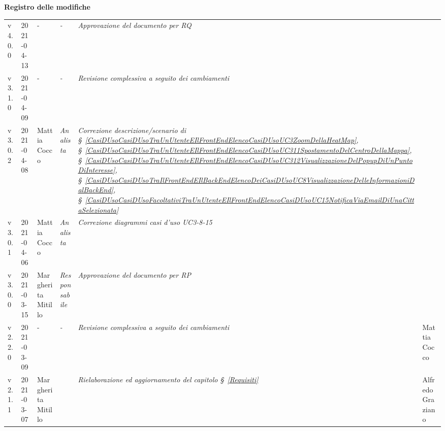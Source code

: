 \quad
\begin{center}
	\LARGE\textbf{Registro delle modifiche}
\end{center}
\def\tabularxcolumn#1{m{#1}}
{

\begin{center}
	\renewcommand{\arraystretch}{1.4}
	\begin{longtable}[c]{|p{2cm-1\tabcolsep}|p{2cm}|p{3cm-2\tabcolsep}|p{}|p{4cm-2\tabcolsep}|p{}|}
		\hline
		\rowcolor{airforceblue}
		\makecell[c]{\textbf{Versione}} & \makecell[c]{\textbf{Data}} & \makecell[c]{\textbf{Autore}} & \makecell[c]{\textbf{Ruolo}} & \makecell[c]{\textbf{Modifica}} & \makecell[c]{\textbf{Verificatore}} \\
		\hline
		\centering v4.0.0 & 2021-04-13 & \centering - & \centering \textit{-} & \textit{Approvazione del documento per RQ} & \makecell[c]{Andrea Cecchin}\\
		\hline
		\centering v3.1.0 & 2021-04-09 & \centering - & \centering \textit{-} & \textit{Revisione complessiva a seguito dei cambiamenti} & \makecell[c]{Andrea Cecchin}\\
		\hline
		\centering v3.0.2 & 2021-04-08 & Mattia Cocco & \centering \textit{Analista} & \textit{Correzione descrizione/scenario di \S~\ref{CasiDUsoCasiDUsoTraUnUtenteEIlFrontEndElencoCasiDUsoUC3ZoomDellaHeatMap}, \S~\ref{CasiDUsoCasiDUsoTraUnUtenteEIlFrontEndElencoCasiDUsoUC311SpostamentoDelCentroDellaMappa}, \S~\ref{CasiDUsoCasiDUsoTraUnUtenteEIlFrontEndElencoCasiDUsoUC312VisualizzazioneDelPopupDiUnPuntoDiInteresse}, \S~\ref{CasiDUsoCasiDUsoTraIlFrontEndEIlBackEndElencoDeiCasiDUsoUC8VisualizzazioneDelleInformazioniDalBackEnd}, \S~\ref{CasiDUsoCasiDUsoFacoltativiTraUnUtenteEIlFrontEndElencoCasiDUsoUC15NotificaViaEmailDiUnaCittaSelezionata}} &  \makecell[c]{Andrea Cecchin} \\
		\hline
		\centering v3.0.1 & 2021-04-06 & Mattia Cocco & \centering \textit{Analista} & \textit{Correzione diagrammi casi d'uso UC3-8-15} & \makecell[c]{Andrea Cecchin}\\
		\hline
		\centering v3.0.0 & 2021-03-15 & Margherita Mitillo & \centering \textit{Responsabile} & \textit{Approvazione del documento per RP} & \makecell[c]{-}\\
		\hline
		\centering v2.2.0 & 2021-03-09 &\centering - & \centering \textit{-} &\textit{Revisione complessiva a seguito dei cambiamenti} & Mattia Cocco\\
		\hline
		\centering v2.1.1 & 2021-03-07 & Margherita Mitillo & \centering{ \textit{Analista} }&\textit{Rielaborazione ed aggiornamento del capitolo \S~\ref{Requisiti}} &  Alfredo Graziano  \\

\end{longtable}
\end{center}}

